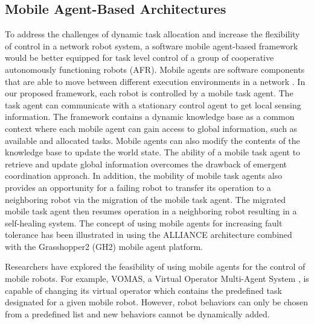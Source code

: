     \subsection{Mobile Agent-Based Architectures}

      To address the challenges of dynamic task allocation and increase the
        flexibility of control in a network robot system, a software mobile 
        agent-based framework would be better equipped for task level control 
        of a group of cooperative autonomously functioning robots (AFR).
      Mobile agents are software components that are able to move between 
        different execution environments in a network \cite{Fuggetta}. 
      In our proposed framework, each robot is controlled by a mobile task agent.
      The task agent can communicate with a stationary control agent to 
        get local sensing information. 
      The framework contains a dynamic knowledge base as a common context 
        where each mobile agent can gain access to global information, such 
        as available and allocated tasks. 
      Mobile agents can also modify the contents of the knowledge base 
        to update the world state. 
      The ability of a mobile task agent to retrieve and update 
        global information overcomes the drawback of emergent coordination 
        approach. 
      In addition, the mobility of mobile task agents also provides an opportunity 
        for a failing robot to transfer its operation to a neighboring 
        robot via the migration of the mobile task agent. 
      The migrated mobile task agent then resumes operation in 
        a neighboring robot resulting in a self-healing system. 
      The concept of using mobile agents for increasing fault tolerance 
        has been illustrated in \cite{Cragg2006} using the ALLIANCE architecture 
        combined with the Grasshopper2 (GH2) mobile agent platform. 

      Researchers have explored the feasibility of using mobile agents for 
        the control of mobile robots.  
      For example, VOMAS, a Virtual Operator Multi-Agent System \cite{Hsu2007},
        is capable of changing its virtual operator which contains the 
        predefined task designated for a given mobile robot. 
      However, robot behaviors can only be chosen from a predefined list and
        new behaviors cannot be dynamically added.

